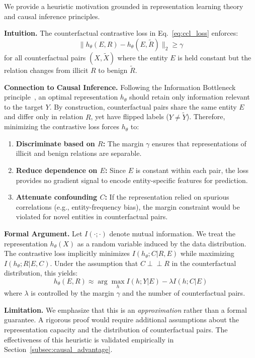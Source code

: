 \documentclass{acmart}
\begin{document}
\begin{proofsketch}
We provide a heuristic motivation grounded in representation learning theory~\cite{bengio2013representation} and causal inference principles.

\textbf{Intuition.} The counterfactual contrastive loss in Eq.~\ref{eq:ccl_loss} enforces:
\begin{equation}
\label{eq:margin_constraint}
\| h_\theta(E, R) - h_\theta(E, \tilde{R}) \|_2 \geq \gamma
\end{equation}
for all counterfactual pairs $(X, \tilde{X})$ where the entity $E$ is held constant but the relation changes from illicit $R$ to benign $\tilde{R}$.

\textbf{Connection to Causal Inference.} Following the Information Bottleneck principle~\cite{tishby2000information}, an optimal representation $h_\theta$ should retain only information relevant to the target $Y$. By construction, counterfactual pairs share the same entity $E$ and differ only in relation $R$, yet have flipped labels ($Y \neq \tilde{Y}$). Therefore, minimizing the contrastive loss forces $h_\theta$ to:
\begin{enumerate}
\item \textbf{Discriminate based on $R$:} The margin $\gamma$ ensures that representations of illicit and benign relations are separable.
\item \textbf{Reduce dependence on $E$:} Since $E$ is constant within each pair, the loss provides no gradient signal to encode entity-specific features for prediction.
\item \textbf{Attenuate confounding $C$:} If the representation relied on spurious correlations (e.g., entity-frequency bias), the margin constraint would be violated for novel entities in counterfactual pairs.
\end{enumerate}

\textbf{Formal Argument.} Let $I(\cdot; \cdot)$ denote mutual information. We treat the representation $h_\theta(X)$ as a random variable induced by the data distribution. The contrastive loss implicitly minimizes $I(h_\theta; C | R, E)$ while maximizing $I(h_\theta; R | E, C)$. Under the assumption that $C \perp\!\!\!\perp R$ in the counterfactual distribution, this yields:
\begin{equation}
h_\theta(E, R) \approx \arg\max_{h} I(h; Y | E) - \lambda I(h; C | E)
\end{equation}
where $\lambda$ is controlled by the margin $\gamma$ and the number of counterfactual pairs.

\textbf{Limitation.} We emphasize that this is an \emph{approximation} rather than a formal guarantee. A rigorous proof would require additional assumptions about the representation capacity and the distribution of counterfactual pairs. The effectiveness of this heuristic is validated empirically in Section~\ref{subsec:causal_advantage}.
\end{proofsketch}
\end{document}
